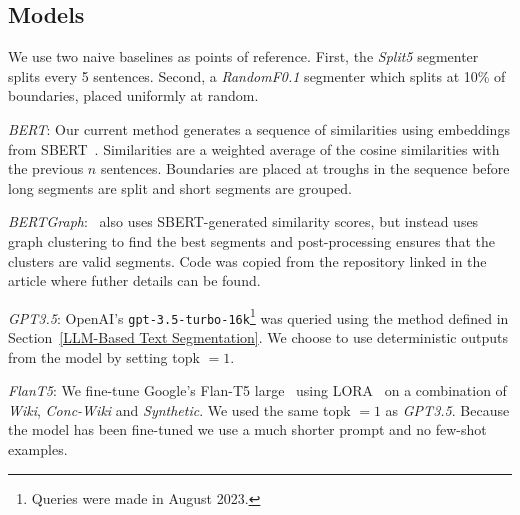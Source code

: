 \subsection{Models}

We use two naive baselines as points of reference. First, the \emph{Split5} segmenter splits every 5 sentences. Second, a \emph{RandomF0.1} segmenter which splits at 10\% of boundaries, placed uniformly at random.

\emph{BERT}: Our current method generates a sequence of similarities using embeddings from SBERT~\cite{SentenceBERT}. Similarities are a weighted average of the cosine similarities with the previous $n$ sentences. Boundaries are placed at troughs in the sequence before long segments are split and short segments are grouped.

\emph{BERTGraph}:~\cite{MasimilianoSegmenter} also uses SBERT-generated similarity scores, but instead uses graph clustering to find the best segments and post-processing ensures that the clusters are valid segments. Code was copied from the repository linked in the article where futher details can be found.

\emph{GPT3.5}\label{GPT3.5}: OpenAI's \texttt{gpt-3.5-turbo-16k}\footnote{Queries were made in August 2023.} was queried using the method defined in Section~\ref{LLM-Based Text Segmentation}. We choose to use deterministic outputs from the model by setting topk $=1$. 

\emph{FlanT5}\label{FlanT5}: We fine-tune Google's Flan-T5 large~\citep{FlanT5} using LORA~\citep{LORA} on a combination of \emph{Wiki}, \emph{Conc-Wiki} and \emph{Synthetic}. We used the same topk $=1$ as \emph{GPT3.5}. Because the model has been fine-tuned we use a much shorter prompt and no few-shot examples.